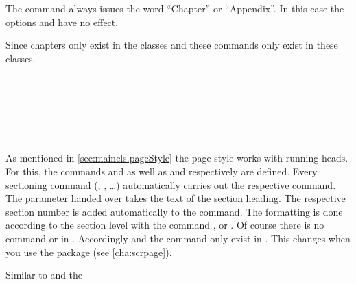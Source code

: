The command  always issues the word ``Chapter'' or
``Appendix''.  In this case the options  and
 have no effect.

Since chapters only exist in the classes  and
 these commands only exist in these classes.
%
%
%


\begin{Declaration}
  \\
  \\
  \\
  \\
  \\
\end{Declaration}%
%
%
%
%
%
%
\begin{Explain}%
  As mentioned in \autoref{sec:maincls.pageStyle} the page style
   works with running heads. For this, the commands  and
   as well as  and
   respectively are defined. Every sectioning
  command (, ,  \dots)
  automatically carries out the respective  command.
  The parameter handed over takes the text of the section
  heading. The respective section number is added
  automatically to the  command. The formatting is done
  according to the section level with the command
  ,  or
  .
  Of course there is no
  command  or  in
  . Accordingly
   and the command 
  only exist in . This changes when you use the
   package (see \autoref{cha:scrpage}).\par
\end{Explain}
Similar to  and  the
